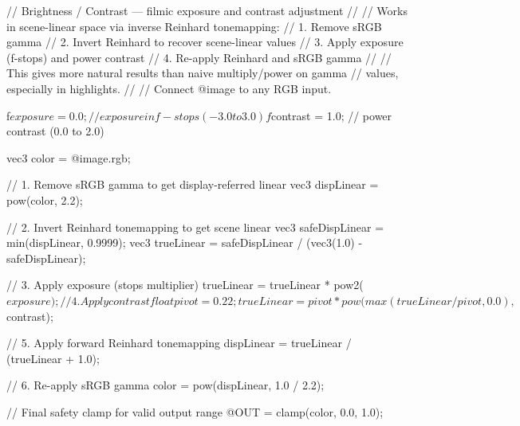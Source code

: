 // Brightness / Contrast — filmic exposure and contrast adjustment
//
// Works in scene-linear space via inverse Reinhard tonemapping:
//   1. Remove sRGB gamma
//   2. Invert Reinhard to recover scene-linear values
//   3. Apply exposure (f-stops) and power contrast
//   4. Re-apply Reinhard and sRGB gamma
//
// This gives more natural results than naive multiply/power on gamma
// values, especially in highlights.
//
// Connect @image to any RGB input.

f$exposure = 0.0;   // exposure in f-stops (-3.0 to 3.0)
f$contrast = 1.0;   // power contrast (0.0 to 2.0)

vec3 color = @image.rgb;

// 1. Remove sRGB gamma to get display-referred linear
vec3 dispLinear = pow(color, 2.2);

// 2. Invert Reinhard tonemapping to get scene linear
vec3 safeDispLinear = min(dispLinear, 0.9999);
vec3 trueLinear = safeDispLinear / (vec3(1.0) - safeDispLinear);

// 3. Apply exposure (stops multiplier)
trueLinear = trueLinear * pow2($exposure);

// 4. Apply contrast
float pivot = 0.22;
trueLinear = pivot * pow(max(trueLinear / pivot, 0.0), $contrast);

// 5. Apply forward Reinhard tonemapping
dispLinear = trueLinear / (trueLinear + 1.0);

// 6. Re-apply sRGB gamma
color = pow(dispLinear, 1.0 / 2.2);

// Final safety clamp for valid output range
@OUT = clamp(color, 0.0, 1.0);